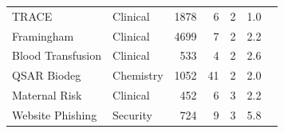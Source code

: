 \begin{table}[t]
\begin{tabular}{@{}llrrrrl@{}}
TRACE & Clinical & 1878 & 6 & 2 & 1.0 & \cite{drysdale2022survset} \\
Framingham & Clinical & 4699 & 7 & 2 & 2.2 & \cite{drysdale2022survset} \\
Blood Transfusion & Clinical & 533 & 4 & 2 & 2.6 & \cite{erickson2025tabarena,vanschoren2014openml} \\
QSAR Biodeg & Chemistry & 1052 & 41 & 2 & 2.0 & \cite{erickson2025tabarena,vanschoren2014openml} \\
Maternal Risk & Clinical & 452 & 6 & 3 & 2.2 & \cite{erickson2025tabarena,vanschoren2014openml} \\
Website Phishing & Security & 724 & 9 & 3 & 5.8 & \cite{erickson2025tabarena,vanschoren2014openml} \\
\bottomrule\end{tabular}\end{table}
